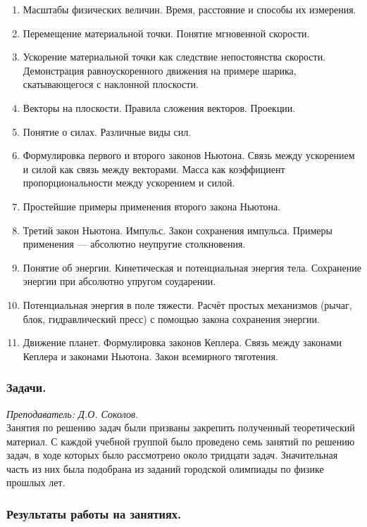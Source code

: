 \documentclass[12pt]{article}
\newlength{\h}
\newlength{\x}
\begin{document}
\begin{enumerate}
\item Масштабы физических величин. Время, расстояние и способы их
  измерения. 
\item Перемещение материальной точки. Понятие мгновенной скорости.
\item Ускорение материальной точки как следствие непостоянства
  скорости. Демонстрация равноускоренного движения на примере
  шарика, скатывающегося с наклонной плоскости.
\item Векторы на плоскости. Правила сложения векторов. Проекции.
\item Понятие о силах. Различные виды сил.
\item Формулировка первого и второго законов Ньютона. Связь между
  ускорением и силой как связь между векторами. Масса как коэффициент
  пропорциональности между ускорением и силой. 
\item Простейшие примеры применения второго закона Ньютона.
\item Третий закон Ньютона. Импульс. Закон сохранения
  импульса. Примеры применения --- абсолютно неупругие столкновения.
\item Понятие об энергии. Кинетическая и потенциальная энергия
  тела. Сохранение энергии при абсолютно упругом соударении.
\item Потенциальная энергия в поле тяжести. Расчёт простых механизмов
  (рычаг, блок, гидравлический пресс) с помощью закона сохранения
  энергии.
\item Движение планет. Формулировка законов Кеплера. Связь между
  законами Кеплера и законами Ньютона. Закон всемирного тяготения. 
\end{enumerate}

\subsubsection{Задачи.}
\label{sec:daily8pr}

\textit{Преподаватель: Д.О. Соколов. }\\

Занятия по решению задач были призваны закрепить полученный
теоретический материал. С каждой учебной группой было проведено семь
занятий по решению задач, в ходе которых было рассмотрено около
тридцати задач. Значительная часть из них была подобрана из заданий
городской олимпиады по физике прошлых лет. 

\subsubsection{Результаты работы на занятиях. }
\label{sec:daily8res}
\end{document}
